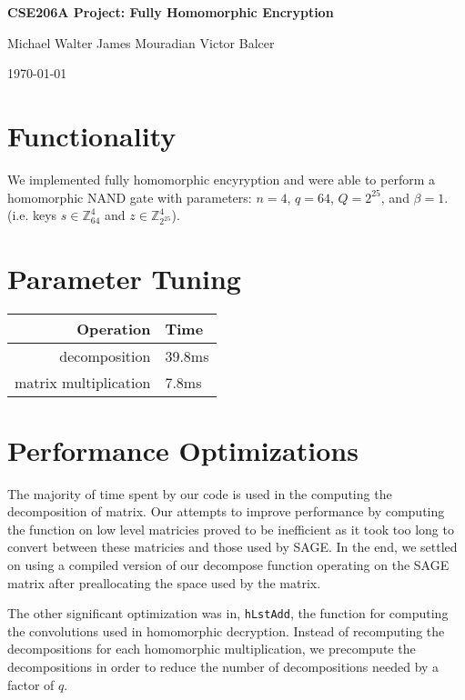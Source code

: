\documentclass{article}
\begin{document}
\centerline{\LARGE{\bf{CSE206A Project: Fully Homomorphic Encryption}}}
\vspace{12.0pt}
\centerline{Michael Walter \hspace{0.1in} James Mouradian \hspace{0.1in} Victor Balcer}
\vspace{4.0pt}
\centerline{\today}
\section{Functionality}
We implemented fully homomorphic encyryption and were able to perform a homomorphic
NAND gate with parameters: $n=4$, $q=64$, $Q=2^{25}$, and $\beta=1$.
(i.e. keys $s\in \mathbb{Z}_{64}^4$ and $z\in\mathbb{Z}_{2^{25}}^4$).

\section{Parameter Tuning}


\begin{tabular}{r   l}
\textbf{Operation} & \textbf{Time} \\
\hline
decomposition & 39.8ms \\
matrix multiplication & 7.8ms \\
\end{tabular}


\section{Performance Optimizations}
The majority of time spent by our code is used in the computing the decomposition of
matrix. Our attempts to improve performance by computing the function on low level
matricies proved to be inefficient as it took too long to convert between these
matricies and those used by SAGE. In the end, we settled on using a compiled version
of our decompose function operating on the SAGE matrix after preallocating the space
used by the matrix.

The other significant optimization was in, \texttt{hLstAdd}, the function for computing the convolutions used in homomorphic decryption. Instead of recomputing the decompositions for each homomorphic multiplication, we precompute the decompositions in order to reduce the number of decompositions needed by a factor of $q$.
\end{document}
